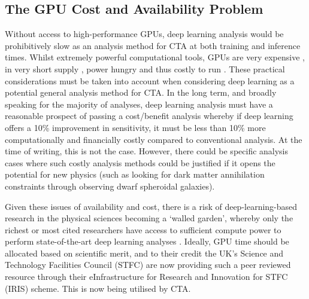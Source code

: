 \subsection{The GPU Cost and Availability Problem}
Without access to high-performance GPUs, deep learning analysis would be prohibitively slow as an analysis method for CTA at both training and inference times. Whilst extremely powerful computational tools, GPUs are very expensive \cite{gpucost}, in very short supply \cite{gpushort}, power hungry \cite{2080ti} and thus costly to run \cite{2080ti}. These practical considerations must be taken into account when considering deep learning as a potential general analysis method for CTA. In the long term, and broadly speaking for the majority of analyses, deep learning analysis must have a reasonable prospect of passing a cost/benefit analysis whereby if deep learning offers a 10\% improvement in sensitivity, it must be less than 10\% more computationally and financially costly compared to conventional analysis. At the time of writing, this is not the case. However, there could be specific analysis cases where such costly analysis methods could be justified if it opens the potential for new physics (such as looking for dark matter annihilation constraints through observing dwarf spheroidal galaxies\cite{gloryduck}).

Given these issues of availability and cost, there is a risk of deep-learning-based research in the physical sciences becoming a `walled garden', whereby only the richest or most cited researchers have access to sufficient compute power to perform state-of-the-art deep learning analyses \cite{gpudivide}. Ideally, GPU time should be allocated based on scientific merit, and to their credit the UK's Science and Technology Facilities Council (STFC) are now providing such a peer reviewed resource through their eInfrastructure for Research and Innovation for STFC (IRIS) scheme. This is now being utilised by CTA.